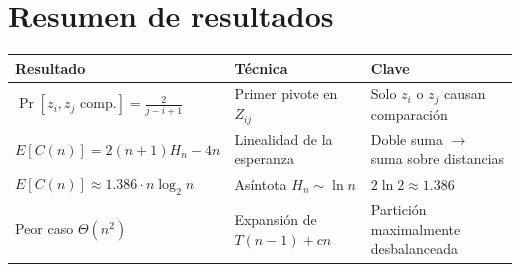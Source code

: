 \documentclass[11pt, letterpaper]{article}
\theoremstyle{definition}
\theoremstyle{plain}
\theoremstyle{remark}
\begin{document}
\section{Resumen de resultados}

\begin{table}[h]
\centering
\begin{tabular}{llp{5.5cm}}
\toprule
\textbf{Resultado} & \textbf{Técnica} & \textbf{Clave} \\
\midrule
$\Pr[z_i, z_j \text{ comp.}] = \frac{2}{j{-}i{+}1}$
  & Primer pivote en $Z_{ij}$
  & Solo $z_i$ o $z_j$ causan comparación \\
$E[C(n)] = 2(n{+}1)H_n - 4n$
  & Linealidad de la esperanza
  & Doble suma $\to$ suma sobre distancias \\
$E[C(n)] \approx 1.386 \cdot n\log_2 n$
  & Asíntota $H_n \sim \ln n$
  & $2\ln 2 \approx 1.386$ \\
Peor caso $\Theta(n^2)$
  & Expansión de $T(n{-}1) + cn$
  & Partición maximalmente desbalanceada \\
\bottomrule
\end{tabular}
\end{table}
\end{document}
